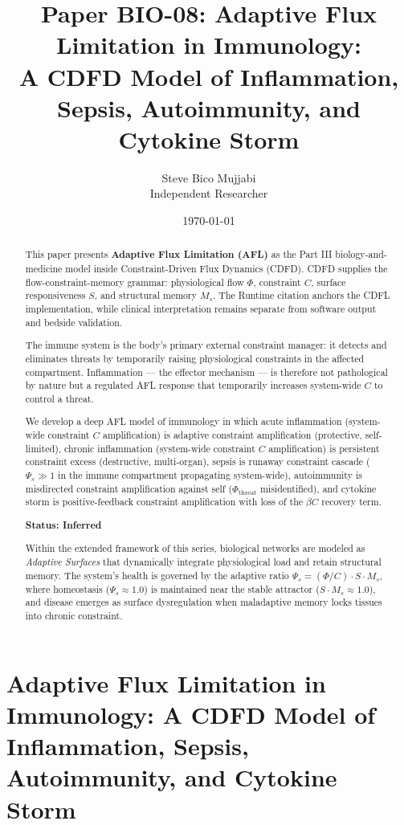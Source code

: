 \documentclass[12pt,a4paper]{article}
\title{\textbf{Paper BIO-08: Adaptive Flux Limitation in Immunology:\\ A CDFD Model of Inflammation, Sepsis, Autoimmunity, and Cytokine Storm}}
\author{Steve Bico Mujjabi\\ \small Independent Researcher}
\date{\today}
\begin{document}
\maketitle

\clearpage
\section*{Adaptive Flux Limitation in Immunology: A CDFD Model of Inflammation, Sepsis, Autoimmunity, and Cytokine Storm}

\begin{abstract}

This paper presents \textbf{Adaptive Flux Limitation (AFL)} as the Part III biology-and-medicine model inside Constraint-Driven Flux Dynamics (CDFD). CDFD supplies the flow-constraint-memory grammar: physiological flow $\Phi$, constraint $C$, surface responsiveness $S$, and structural memory $M_s$. The Runtime citation anchors the CDFL implementation, while clinical interpretation remains separate from software output and bedside validation.

The immune system is the body's primary external constraint manager: it detects and eliminates threats by temporarily raising physiological constraints in the affected compartment. Inflammation --- the effector mechanism --- is therefore not pathological by nature but a regulated AFL response that temporarily increases system-wide $C$ to control a threat.

We develop a deep AFL model of immunology in which acute inflammation (system-wide constraint $C$ amplification) is adaptive constraint amplification (protective, self-limited), chronic inflammation (system-wide constraint $C$ amplification) is persistent constraint excess (destructive, multi-organ), sepsis is runaway constraint cascade ($\Psi_s \gg 1$ in the immune compartment propagating system-wide), autoimmunity is misdirected constraint amplification against self ($\Phi_{\mathrm{threat}}$ misidentified), and cytokine storm is positive-feedback constraint amplification with loss of the $\beta C$ recovery term.

\textbf{Status: Inferred}

\medskip
\noindent Within the extended framework of this series, biological networks are modeled as \emph{Adaptive Surfaces} that dynamically integrate physiological load and retain structural memory. The system's health is governed by the adaptive ratio $\Psi_s = (\Phi/C) \cdot S \cdot M_s$, where homeostasis ($\Psi_s \approx 1.0$) is maintained near the stable attractor ($S \cdot M_s \approx 1.0$), and disease emerges as surface dysregulation when maladaptive memory locks tissues into chronic constraint.

\end{abstract}
\end{document}
